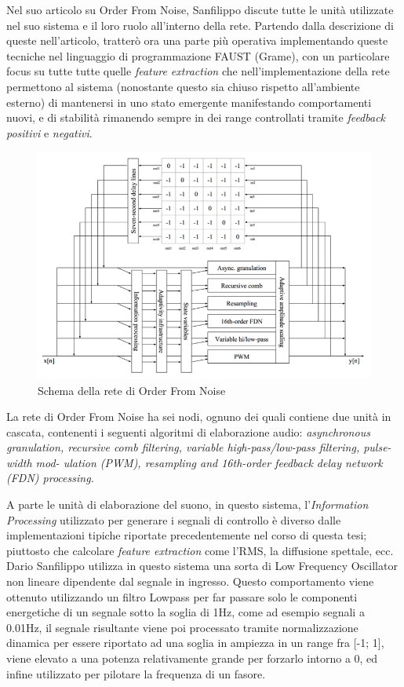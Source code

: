 Nel suo articolo su Order From Noise, Sanfilippo discute tutte le unità utilizzate
nel suo sistema e il loro ruolo all'interno della rete.
Partendo dalla descrizione di queste nell'articolo, tratterò ora una parte più operativa 
implementando queste tecniche nel linguaggio di programmazione FAUST (Grame), 
con un particolare focus su tutte tutte quelle \textit{feature extraction}
che nell'implementazione della rete permettono al sistema 
(nonostante questo sia chiuso rispetto all'ambiente esterno) 
di mantenersi in uno stato emergente manifestando comportamenti nuovi,
e di stabilità rimanendo sempre in dei range controllati tramite \emph{feedback positivi} e \emph{negativi}.

\begin{figure}[h!]
\begin{center}
    \includegraphics[width=14cm]{figures/OFNnetwork.pdf}
    \caption{Schema della rete di Order From Noise}
    \end{center}
\end{figure}

La rete di Order From Noise ha sei nodi, ognuno dei quali contiene due unità in cascata, 
contenenti i seguenti algoritmi di elaborazione audio: 
\textit{asynchronous granulation, recursive comb filtering, variable high-pass/low-pass filtering, pulse-width mod-
ulation (PWM), resampling and 16th-order feedback delay network (FDN) processing.} 

A parte le unità di elaborazione del suono,
in questo sistema, l'\textit{Information Processing} utilizzato per generare i 
segnali di controllo è diverso
dalle implementazioni tipiche riportate precedentemente nel corso di questa tesi;
piuttosto che calcolare \textit{feature extraction} come l'RMS, la diffusione spettale, ecc. 
Dario Sanfilippo utilizza in questo sistema una sorta di Low Frequency Oscillator
non lineare dipendente dal segnale in ingresso.
Questo comportamento viene ottenuto utilizzando un filtro Lowpass per far 
passare solo le componenti energetiche di un segnale sotto la soglia di 1Hz,
come ad esempio segnali a 0.01Hz, il segnale risultante viene poi processato
tramite normalizzazione dinamica per essere riportato ad una soglia in ampiezza
in un range fra [-1; 1],
viene elevato a una potenza relativamente grande per forzarlo intorno a 0,
ed infine utilizzato per pilotare la frequenza di un fasore.

